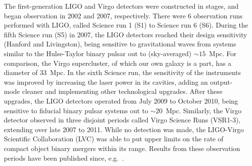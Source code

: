 The first-generation LIGO and Virgo detectors were constructed in stages, and
began observation in 2002 and 2007, respectively. There were 6 observation 
runs performed with LIGO, called Science run 1 (S1) to Science run 6 (S6). 
During the fifth Science run (S5) in 2007, the LIGO detectors reached their
design sensitivity (Hanford and Livingston), being sensitive to gravitational 
waves from systems similar to the Hulse-Taylor binary pulsar out to 
(sky-averaged) $\sim 15$~Mpc.
For comparison, the Virgo supercluster, of which our own galaxy is a part, has
a diameter of $33$~Mpc. In the sixth Science run, the sensitivity of the 
instruments was improved by increasing the laser power in its cavities, adding 
an output-mode cleaner and implementing other technological upgrades. 
After these upgrades, the LIGO detectors operated from July 2009
to October 2010, being sensitive to fiducial binary pulsar systems out to 
$\sim 20$~Mpc. 
Similarly, the Virgo detector observed in three disjoint periods called Virgo 
Science Runs (VSR1-3), extending over late 2007 to 2011.
While no detection was made, the LIGO-Virgo Scientific Collaboration
(LVC) was able to put upper limits on the rate of compact object binary mergers
within its range. Results from these observation periods have been published 
since, e.g.~\cite{Messaritaki:2005wv,Abadie:2010mt,Abadie:2012rq,Abbott:2009km,
Colaboration:2011nz,Abadie:2010yb,Abbott:2009qj,Abbott:2009tt,Abadie:2011kd,
Aasi:2012rja,Abbott:2003yq,Abbott:2005pu,Sintes:2005fp,Abadie:2011md,
Palomba:2012wn}. 

